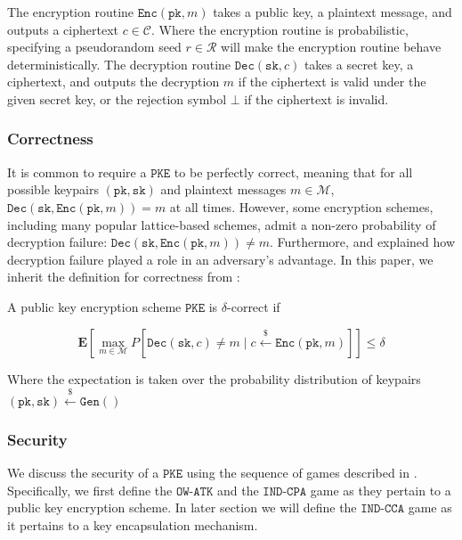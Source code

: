 \documentclass[floatrow,journal=tches,submission]{iacrtrans}
\newcommand{\pke}{\texttt{PKE}}
\newcommand{\keygen}{\texttt{Gen}}
\newcommand{\encrypt}{\texttt{Enc}}
\newcommand{\decrypt}{\texttt{Dec}}
\newcommand{\pk}{\texttt{pk}}
\newcommand{\sk}{\texttt{sk}}
\newcommand{\leftsample}{\stackrel{\$}{\leftarrow}}
\begin{document}
The encryption routine $\encrypt(\pk, m)$ takes a public key, a plaintext message, and outputs a ciphertext $c \in \mathcal{C}$. Where the encryption routine is probabilistic, specifying a pseudorandom seed $r \in \mathcal{R}$ will make the encryption routine behave deterministically. The decryption routine $\decrypt(\sk, c)$ takes a secret key, a ciphertext, and outputs the decryption $\hat{m}$ if the ciphertext is valid under the given secret key, or the rejection symbol $\bot$ if the ciphertext is invalid.

\subsubsection{Correctness}
It is common to require a $\pke$ to be perfectly correct, meaning that for all possible keypairs $(\pk, \sk)$ and plaintext messages $m \in \mathcal{M}$, $\decrypt(\sk, \encrypt(\pk, m)) = m$ at all times. However, some encryption schemes, including many popular lattice-based schemes, admit a non-zero probability of decryption failure: $\decrypt(\sk, \encrypt(\pk, m)) \neq m$. Furthermore, \cite{hofheinz2017modular} and \cite{avanzi2019crystals} explained how decryption failure played a role in an adversary's advantage. In this paper, we inherit the definition for correctness from \cite{hofheinz2017modular}:

\begin{definition}\label{def:delta-correctness}
    A public key encryption scheme $\pke$ is $\delta$-correct if

    \begin{equation*}
        \mathbf{E}[
            \max_{m \in \mathcal{M}} P[\decrypt(\sk, c) \neq m \mid c \leftsample \encrypt(\pk, m)]
        ] \leq \delta
    \end{equation*}

    Where the expectation is taken over the probability distribution of keypairs $(\pk, \sk) \leftsample \keygen()$
\end{definition}

\subsubsection{Security}
We discuss the security of a $\pke$ using the sequence of games described in \cite{shoup2004sequences}. Specifically, we first define the $\texttt{OW-ATK}$ and the $\texttt{IND-CPA}$ game as they pertain to a public key encryption scheme. In later section we will define the $\texttt{IND-CCA}$ game as it pertains to a key encapsulation mechanism.
\end{document}
